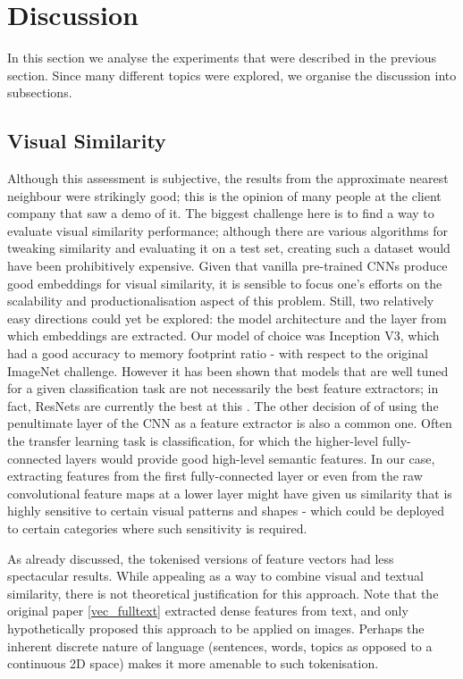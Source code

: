 \chapter{Discussion}

In this section we analyse the experiments that were described in the previous section.
Since many different topics were explored, we organise the discussion into subsections.

\section{Visual Similarity}

Although this assessment is subjective, the results from the approximate nearest neighbour were strikingly good; this is the opinion of many people at the client company that saw a demo of it.
The biggest challenge here is to find a way to evaluate visual similarity performance; although there are various algorithms for tweaking similarity and evaluating it on a test set, creating such a dataset would have been prohibitively expensive.
Given that vanilla pre-trained CNNs produce good embeddings for visual similarity, it is sensible to focus one's efforts on the scalability and productionalisation aspect of this problem.
Still, two relatively easy directions could yet be explored: the model architecture and the layer from which embeddings are extracted.
Our model of choice was Inception V3, which had a good accuracy to memory footprint ratio - with respect to the original ImageNet challenge.
However it has been shown that models that are well tuned for a given classification task are not necessarily the best feature extractors; in fact, ResNets are currently the best at this \cite{img_feature_extract}.
The other decision of of using the penultimate layer of the CNN as a feature extractor is also a common one.
Often the transfer learning task is classification, for which the higher-level fully-connected layers would provide good high-level semantic features.
In our case, extracting features from the first fully-connected layer or even from the raw convolutional feature maps at a lower layer might have given us similarity that is highly sensitive to certain visual patterns and shapes - which could be deployed to certain categories where such sensitivity is required.

As already discussed, the tokenised versions of feature vectors had less spectacular results.
While appealing as a way to combine visual and textual similarity, there is not theoretical justification for this approach.
Note that the original paper \ref{vec_fulltext} extracted dense features from text, and only hypothetically proposed this approach to be applied on images.
Perhaps the inherent discrete nature of language (sentences, words, topics as opposed to a continuous 2D space)  makes it more amenable to such tokenisation.

